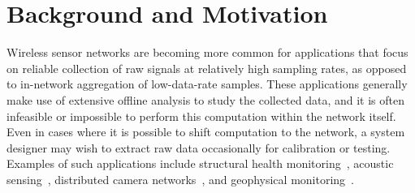 %

%
%
%
%



%
%


\section{Background and Motivation}
\label{lance-sec-motivation}


Wireless sensor networks are becoming more common for applications
that focus on reliable collection of raw signals at relatively high sampling
rates, as opposed to in-network aggregation of low-data-rate samples.
These applications generally make use of extensive offline analysis 
to study the collected data, and it is often infeasible
or impossible to perform this computation within the network itself.
Even in cases where it is possible to shift computation to the network, a
system designer may wish to extract raw data occasionally for calibration
or testing.  Examples of such applications include structural health
monitoring~\cite{netshm-spots06,ggb-ipsn07,wimms-lynch06}, acoustic
sensing~\cite{vango,vigilnet,girod-ipsn07,enviromic}, distributed camera
networks~\cite{cyclops}, and geophysical monitoring~\cite{volcano-osdi06}.

